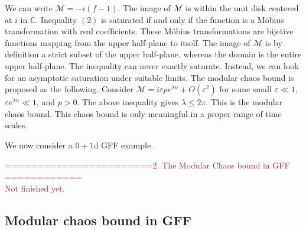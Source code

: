 \documentclass[a4paper,11pt]{article}
\theoremstyle{definition}
\newcommand{\mM}{\mathcal{M}}
\newcommand{\KL}[1]{\textcolor{brown}{#1}}
\begin{document}
We can write $\mM = -i(f-1)$. The image of $\mM$ is within the unit disk centered at $i$ in $\mathbb{C}$. Inequality $(2)$ is saturated if and only if the function is a M\"obius transformation with real coefficients. These M\"obius transformations are bijetive functions mapping from the upper half-plane to itself. The image of $\mM$ is by definition a strict subset of the upper half-plane, whereas the domain is the entire upper half-plane. The inequality can never exactly saturate. Instead, we can look for an asymptotic saturation under suitable limits. The modular chaos bound is proposed as the following\cite{}. Consider $\mM = i\varepsilon p e^{\lambda u} + O(\varepsilon^2)$ for some small $\varepsilon \ll 1$, $\varepsilon e^{\lambda u} \ll 1$, and $p>0$. The above inequality gives $\lambda \leq 2\pi$. This is the modular chaos bound. This chaos bound is only meaningful in a proper range of time scales. 

We now consider a $0+1$d GFF example.



\KL{=======================2. The Modular Chaos bound in GFF ============}\\
\KL{Not finished yet.}

\subsection{Modular chaos bound in GFF}
\end{document}
